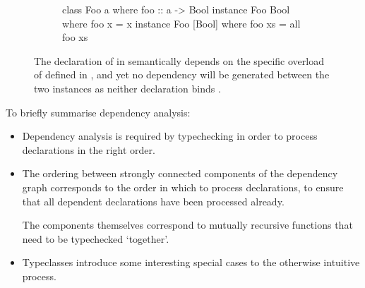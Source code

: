 \documentclass[dissertation.tex]{subfiles}
\begin{document}
{{\begin{itemize}
{            \begin{figure}
            \centering
            \begin{subfigure}[t]{0.8\textwidth}
            \begin{haskellfigure}
            class Foo a where
                foo :: a -> Bool
            instance Foo Bool where
                foo x = x
            instance Foo [Bool] where
                foo xs = all foo xs
            \end{haskellfigure}
            \end{subfigure}
            \caption{The declaration of  in  semantically depends on the specific overload of  defined in , and yet no dependency will be generated between the two instances as neither declaration binds .}
            \end{figure}
        }
        \end{itemize}

        To briefly summarise dependency analysis:

        \begin{itemize}
        \item Dependency analysis is required by typechecking in order to process declarations in the right order.
        \item
        {
            The ordering between strongly connected components of the dependency graph corresponds to the order in which to process declarations, to ensure that all dependent declarations have been processed already.
            
            The components themselves correspond to mutually recursive functions that need to be typechecked `together'.
        }
        \item Typeclasses introduce some interesting special cases to the otherwise intuitive process.
        \end{itemize}
    }
}
\end{document}
